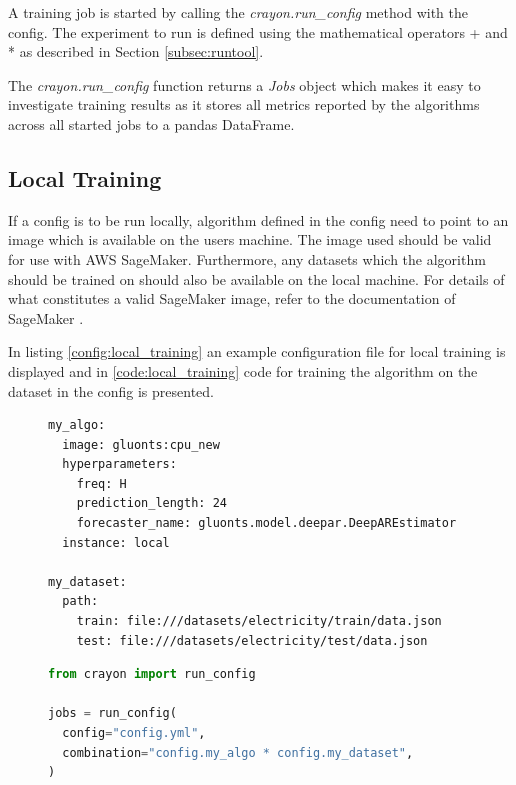 A training job is started by calling the \textit{crayon.run\_config} method with the config. The experiment to run is defined using the mathematical operators + and * as described in Section \ref{subsec:runtool}.

The \textit{crayon.run\_config} function returns a \textit{Jobs} object which makes it easy to investigate training results as it stores all metrics reported by the algorithms across all started jobs to a pandas DataFrame.

\subsection{Local Training}
If a config is to be run locally, algorithm defined in the config need to point to an image which is available on the users machine. The image used should be valid for use with AWS SageMaker. Furthermore, any datasets which the algorithm should be trained on should also be available on the local machine. For details of what constitutes a valid SageMaker image, refer to the documentation of SageMaker \cite{sagemaker_docker_documentation}.

In listing \ref{config:local_training} an example configuration file for local training is displayed and in \ref{code:local_training} code for training the algorithm on the dataset in the config is presented.
\begin{figure}[h]
  \begin{lstlisting}[label={config:local_training}, caption={Config file for running local training jobs}]
my_algo:
  image: gluonts:cpu_new
  hyperparameters:
    freq: H
    prediction_length: 24
    forecaster_name: gluonts.model.deepar.DeepAREstimator
  instance: local

my_dataset:
  path:
    train: file:///datasets/electricity/train/data.json
    test: file:///datasets/electricity/test/data.json
  \end{lstlisting}
\end{figure}
\begin{figure}[h]
  \begin{lstlisting}[language=Python, label={code:local_training}, caption={Code for running local training jobs using Crayon}]
from crayon import run_config

jobs = run_config(
  config="config.yml",
  combination="config.my_algo * config.my_dataset",
)
  \end{lstlisting}
\end{figure}



